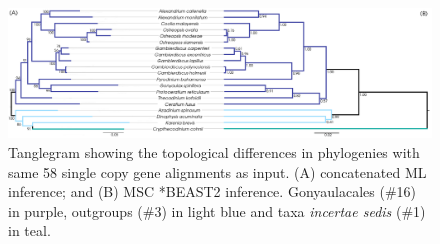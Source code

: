 \documentclass[fleqn,10pt,lineno]{wlpeerj} %
\begin{document}
\begin{figure}[ht]
\centering
\includegraphics[width=\linewidth]{gonya-figs/MSC-BI-vs-singlecopy-concat-ML.png} 
\caption{Tanglegram showing the topological differences in phylogenies with same 58 single copy gene alignments as input. (A) concatenated ML inference; and (B) MSC *BEAST2 inference. Gonyaulacales (\#16) in purple, outgroups (\#3) in light blue and taxa \textit{incertae sedis} (\#1) in teal.} 
\label{fig:tangleconcatML}
\end{figure} 
\end{document}
